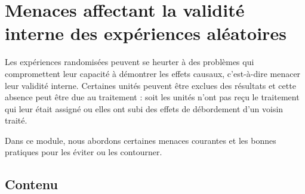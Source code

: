 \documentclass[
  12pt,
]{book}
\begin{document}
\hypertarget{menaces-affectant-la-validituxe9-interne-des-expuxe9riences-aluxe9atoires}{%
\chapter{Menaces affectant la validité interne des expériences aléatoires}\label{menaces-affectant-la-validituxe9-interne-des-expuxe9riences-aluxe9atoires}}

Les expériences randomisées peuvent se heurter à des problèmes qui compromettent leur capacité à démontrer les effets causaux, c'est-à-dire menacer leur validité interne.
Certaines unités peuvent être exclues des résultats et cette absence peut être due au traitement : soit les unités n'ont pas reçu le traitement qui leur était assigné ou elles ont subi des effets de débordement d'un voisin traité.

Dans ce module, nous abordons certaines menaces courantes et les bonnes pratiques pour les éviter ou les contourner.

\hypertarget{contenu-7}{%
\section{Contenu}\label{contenu-7}}
\end{document}
